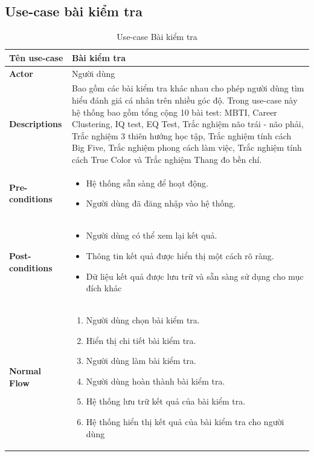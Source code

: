 \subsection{Use-case bài kiểm tra}
    \begin{longtable}[H]{|l|p{}|}
        \caption{Use-case Bài kiểm tra}
        \\ \hline
        \textbf{Tên use-case} & Bài kiểm tra \\
        \hline
        \textbf{Actor} & Người dùng \\
        \hline
        \textbf{Descriptions} & Bao gồm các bài kiểm tra khác nhau cho phép người dùng tìm hiểu đánh giá cá nhân trên nhiều góc độ. Trong use-case này hệ thống bao gồm tổng cộng 10 bài test: MBTI, Career Clustering, IQ test, EQ Test, Trắc nghiệm não trái - não phải, Trắc nghiệm 3 thiên hướng học tập, Trắc nghiệm tính cách Big Five, Trắc nghiệm phong cách làm việc, Trắc nghiệm tính cách True Color và Trắc nghiệm Thang đo bền chí.\\
        \hline
        \textbf{Pre-conditions} & \vspace{-1cm} \begin{itemize}[leftmargin=4mm]
            \setlength\itemsep{0em}
            \item Hệ thống sẵn sàng để hoạt động.
            \item Người dùng đã đăng nhập vào hệ thống.
        \end{itemize} \\
        
        \hline

        \textbf{Post-conditions} & \vspace{-1cm} \begin{itemize}[leftmargin=4mm]
            \setlength\itemsep{0em}
            \item Người dùng có thể xem lại kết quả.
            \item Thông tin kết quả được hiển thị một cách rõ ràng.
            \item Dữ liệu kết quả được lưu trữ và sẵn sàng sử dụng cho mục đích khác
        \end{itemize} \\
        
        \hline
        
        \textbf{Normal Flow} &  \vspace{-1cm} 
            \begin{enumerate}[leftmargin=5.5mm]
                \setlength\itemsep{0em}
                \item Người dùng chọn bài kiểm tra.
                \item Hiển thị chi tiết bài kiểm tra.
                \item Người dùng làm bài kiểm tra.
                \item Người dùng hoàn thành bài kiểm tra.
                \item Hệ thống lưu trữ kết quả của bài kiểm tra.
                \item Hệ thống hiển thị kết quả của bài kiểm tra cho người dùng
            \end{enumerate}\\
            

\end{longtable}
